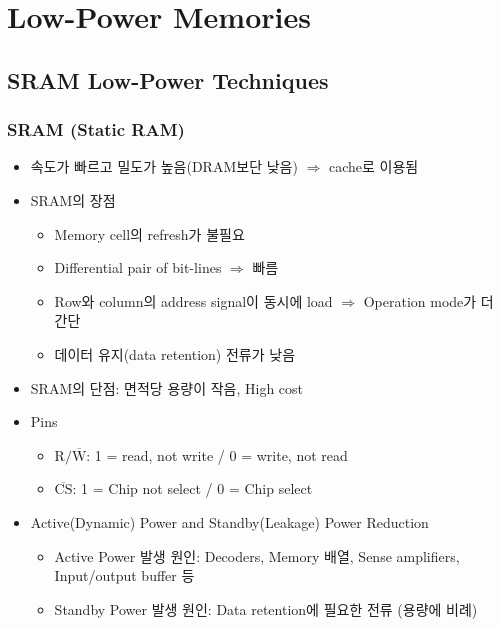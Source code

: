 \section{Low-Power Memories}

\subsection{SRAM Low-Power Techniques}

\subsubsection*{SRAM (Static RAM)}
\begin{itemize}
    \item 속도가 빠르고 밀도가 높음(DRAM보단 낮음) $\Rightarrow$ cache로 이용됨
    \item SRAM의 장점
    \begin{itemize}
        \item Memory cell의 refresh가 불필요
        \item Differential pair of bit-lines $\Rightarrow$ 빠름
        \item Row와 column의 address signal이 동시에 load $\Rightarrow$ Operation mode가 더 간단
        \item 데이터 유지(data retention) 전류가 낮음
    \end{itemize}
    \item SRAM의 단점: 면적당 용량이 작음, High cost
    \item Pins
    \begin{itemize}
        \item $\mathrm{R/\overline{W}}$: 1 = read, not write / 0 = write, not read
        \item $\mathrm{\overline{CS}}$: 1 = Chip not select / 0 = Chip select
    \end{itemize}
    \item Active(Dynamic) Power and Standby(Leakage) Power Reduction
    \begin{itemize}
        \item Active Power 발생 원인: Decoders, Memory 배열, Sense amplifiers, Input/output buffer 등
        \item Standby Power 발생 원인: Data retention에 필요한 전류 (용량에 비례)
    \end{itemize}
\end{itemize}

